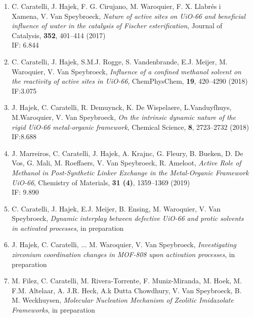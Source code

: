 \begin{enumerate}
\item
C. Caratelli, J. Hajek, F. G. Cirujano, M. Waroquier, F. X. Llabr\'es i Xamena, V. Van Speybroeck, 
\textit{Nature of active sites on UiO-66 and beneficial influence of water in the catalysis of Fischer esterification},
Journal of Catalysis, \textbf{352}, 401--414 (2017) \\
IF: 6.844

\item
C. Caratelli, J. Hajek, S.M.J. Rogge, S. Vandenbrande, E.J. Meijer, M. Waroquier, V. Van Speybroeck, 
\textit{Influence of a confined methanol solvent on the reactivity of active sites in UiO-66}, ChemPhysChem, \textbf{19}, 420--4290 (2018)\\ 
IF:3.075 

\item
J. Hajek, C. Caratelli, R. Demuynck, K. De Wispelaere, L.Vanduyfhuys, M.Waroquier, V. Van Speybroeck, 
\textit{On the intrinsic dynamic nature of the rigid UiO-66 metal-organic framework},  Chemical Science, \textbf{8}, 2723--2732 (2018)\\ IF:8.688

\item
J. Marreiros, C. Caratelli, J. Hajek, A. Krajnc, G. Fleury, B. Bueken, D. De Vos, G. Mali, M. Roeffaers, V. Van Speybroeck, R. Ameloot, 
\textit{Active Role of Methanol in Post-Synthetic Linker Exchange in the Metal-Organic Framework UiO-66}, Chemistry of Materials, \textbf{31 (4)}, 1359--1369 (2019)\\ 
IF: 9.890

\item
C. Caratelli, J. Hajek, E.J. Meijer, B. Ensing, M. Waroquier, V. Van Speybroeck, 
\textit{Dynamic interplay between defective UiO-66 and protic solvents in activated processes}, in preparation\\ 

\item
J. Hajek, C. Caratelli, ... M. Waroquier, V. Van Speybroeck, 
\textit{Investigating zirconium coordination changes in MOF-808 upon activation processes}, in preparation\\ 

\item
M. Filez, C. Caratelli, M. Rivera-Torrente, F. Muniz-Miranda, M. Hoek, M. F.M. Altelaar, A. J.R. Heck, A.k Dutta Chowdhury, V. Van Speybroeck, B. M. Weckhuysen, 
\textit{Molecular Nucleation Mechanism of Zeolitic Imidazolate Frameworks}, in preparation\\
\end{enumerate}

